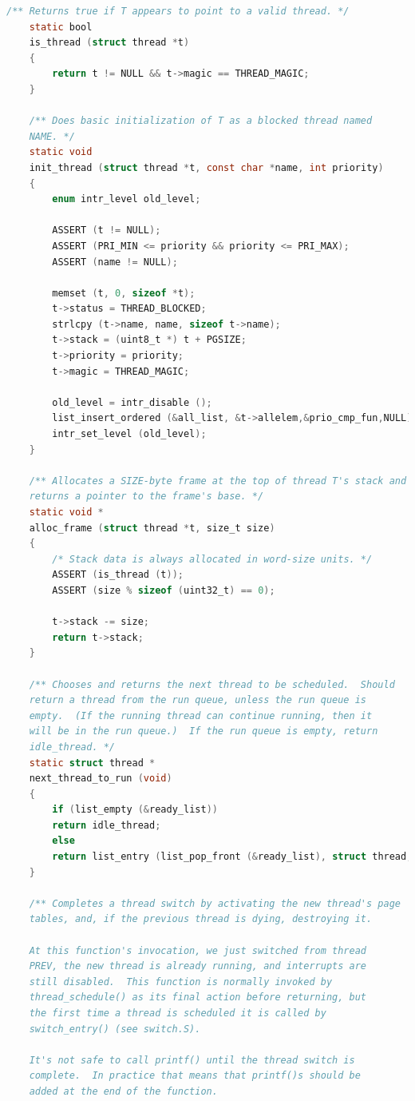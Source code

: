\documentclass{article}
\begin{document}
\begin{lstlisting}[language=C, title=\texttt{thread.c}]
	/** Returns true if T appears to point to a valid thread. */
	static bool
	is_thread (struct thread *t)
	{
		return t != NULL && t->magic == THREAD_MAGIC;
	}
	
	/** Does basic initialization of T as a blocked thread named
	NAME. */
	static void
	init_thread (struct thread *t, const char *name, int priority)
	{
		enum intr_level old_level;
		
		ASSERT (t != NULL);
		ASSERT (PRI_MIN <= priority && priority <= PRI_MAX);
		ASSERT (name != NULL);
		
		memset (t, 0, sizeof *t);
		t->status = THREAD_BLOCKED;
		strlcpy (t->name, name, sizeof t->name);
		t->stack = (uint8_t *) t + PGSIZE;
		t->priority = priority;
		t->magic = THREAD_MAGIC;
		
		old_level = intr_disable ();
		list_insert_ordered (&all_list, &t->allelem,&prio_cmp_fun,NULL);
		intr_set_level (old_level);
	}
	
	/** Allocates a SIZE-byte frame at the top of thread T's stack and
	returns a pointer to the frame's base. */
	static void *
	alloc_frame (struct thread *t, size_t size) 
	{
		/* Stack data is always allocated in word-size units. */
		ASSERT (is_thread (t));
		ASSERT (size % sizeof (uint32_t) == 0);
		
		t->stack -= size;
		return t->stack;
	}
	
	/** Chooses and returns the next thread to be scheduled.  Should
	return a thread from the run queue, unless the run queue is
	empty.  (If the running thread can continue running, then it
	will be in the run queue.)  If the run queue is empty, return
	idle_thread. */
	static struct thread *
	next_thread_to_run (void) 
	{
		if (list_empty (&ready_list))
		return idle_thread;
		else
		return list_entry (list_pop_front (&ready_list), struct thread, elem);
	}
	
	/** Completes a thread switch by activating the new thread's page
	tables, and, if the previous thread is dying, destroying it.
	
	At this function's invocation, we just switched from thread
	PREV, the new thread is already running, and interrupts are
	still disabled.  This function is normally invoked by
	thread_schedule() as its final action before returning, but
	the first time a thread is scheduled it is called by
	switch_entry() (see switch.S).
	
	It's not safe to call printf() until the thread switch is
	complete.  In practice that means that printf()s should be
	added at the end of the function.
	

\end{lstlisting}
\end{document}
